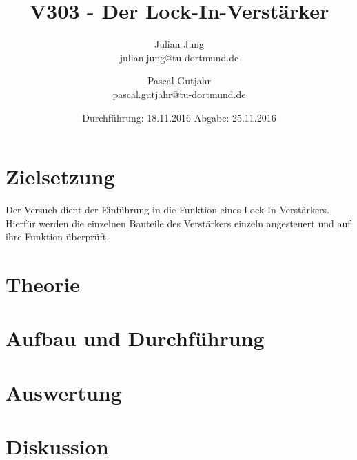 

\title{V303 - Der Lock-In-Verstärker}
\author{Julian Jung \\ julian.jung@tu-dortmund.de
  \and Pascal Gutjahr \\ pascal.gutjahr@tu-dortmund.de}
  \date{Durchführung: 18.11.2016
  \hspace{3em}
  Abgabe: 25.11.2016}
  
\maketitle
\newpage
\tableofcontents
\newpage
\section{Zielsetzung}
Der Versuch dient der Einführung in die Funktion eines Lock-In-Verstärkers.
Hierfür werden die einzelnen Bauteile des Verstärkers einzeln angesteuert und
auf ihre Funktion überprüft.
\section{Theorie}
% 
\section{Aufbau und Durchführung}
% 
\section{Auswertung}
% 
\section{Diskussion}
% 
\printbibliography

